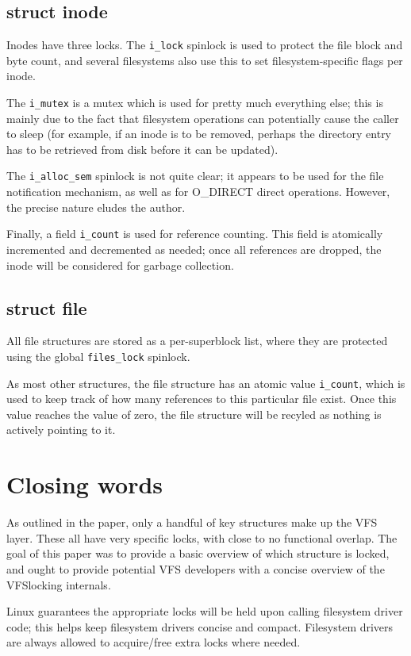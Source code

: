 \documentclass[a4paper,11pt]{article}
\begin{document}
\subsection{struct inode}

Inodes have three locks. The \texttt{i\_lock} spinlock is used to protect the file block and byte count, and several filesystems also use this to set filesystem-specific flags per inode.

The \texttt{i\_mutex} is a mutex which is used for pretty much everything else; this is mainly due to the fact that filesystem operations can potentially cause the caller to sleep (for example, if an inode is to be removed, perhaps the directory entry has to be retrieved from disk before it can be updated).

The \texttt{i\_alloc\_sem} spinlock is not quite clear; it appears to be used for the file notification mechanism, as well as for O\_DIRECT direct operations. However, the precise nature eludes the author.

Finally, a field \texttt{i\_count} is used for reference counting. This field is atomically incremented and decremented as needed; once all references are dropped, the inode will be considered for garbage collection.

\subsection{struct file}

All file structures are stored as a per-superblock list, where they are protected using the global \texttt{files\_lock} spinlock.

As most other structures, the file structure has an atomic value \texttt{i\_count}, which is used to keep track of how many references to this particular file exist. Once this value reaches the value of zero, the file structure will be recyled as nothing is actively pointing to it.

\section{Closing words}

As outlined in the paper, only a handful of key structures make up the VFS layer. These all have very specific locks, with close to no functional overlap. The goal of this paper was to provide a basic overview of which structure is locked, and ought to provide potential VFS developers with a concise overview of the VFSlocking internals.

Linux guarantees the appropriate locks will be held upon calling filesystem driver code; this helps keep filesystem drivers concise and compact. Filesystem drivers are always allowed to acquire/free extra locks where needed.


\end{document}
